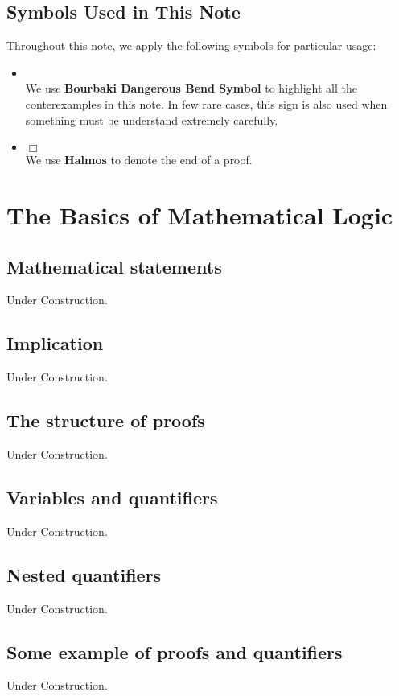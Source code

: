 \documentclass[a4paper]{book}
\theoremstyle{break}
\begin{document}
		\section*{Symbols Used in This Note}
			Throughout this note, we apply the following symbols for particular usage:
			\begin{itemize}
				\item \textdbend\\
				We use \textbf{Bourbaki Dangerous Bend Symbol} to highlight all the conterexamples in this note.
				In few rare cases, this sign is also used when something must be understand extremely carefully.
				\item $\Box$\\
				We use \textbf{Halmos} to denote the end of a proof.
			\end{itemize}
	\tableofcontents

	\mainmatter
	\pagestyle{fancy}
	\fancyhf{}
	\cfoot{\thepage}
	\fancyhead[LO]{\slshape \leftmark}
	\fancyhead[LE,RO]{\slshape \rightmark}
	\renewcommand{\headrulewidth}{0pt}

	\chapter{The Basics of Mathematical Logic}
		\section{Mathematical statements}
			Under Construction.
		\section{Implication}
			Under Construction.
		\section{The structure of proofs}
			Under Construction.
		\section{Variables and quantifiers}
			Under Construction.
		\section{Nested quantifiers}
			Under Construction.
		\section{Some example of proofs and quantifiers}
			Under Construction.
\end{document}
